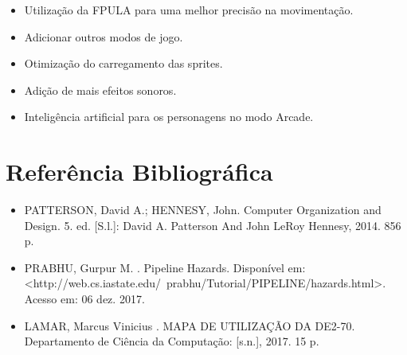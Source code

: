 \documentclass{vgtc}                          %
\begin{document}
\begin{itemize}
\item Utilização da FPULA para uma melhor precisão na movimentação.
\item Adicionar outros modos de jogo.
\item Otimização do carregamento das sprites.
\item Adição de mais efeitos sonoros.
\item Inteligência artificial para os personagens no modo Arcade. 
\end{itemize} 


\section{Referência Bibliográfica}

\begin{itemize}
\item PATTERSON, David A.; HENNESY, John. Computer Organization and Design. 5. ed. [S.l.]: David A. Patterson And John LeRoy Hennesy, 2014. 856 p.
\item PRABHU, Gurpur M. . Pipeline Hazards. Disponível em: <http://web.cs.iastate.edu/~prabhu/Tutorial/PIPELINE/hazards.html>. Acesso em: 06 dez. 2017.
\item LAMAR, Marcus Vinicius . MAPA DE UTILIZAÇÃO DA DE2-70. Departamento de Ciência da Computação: [s.n.], 2017. 15 p.
\end{itemize}




\end{document}
